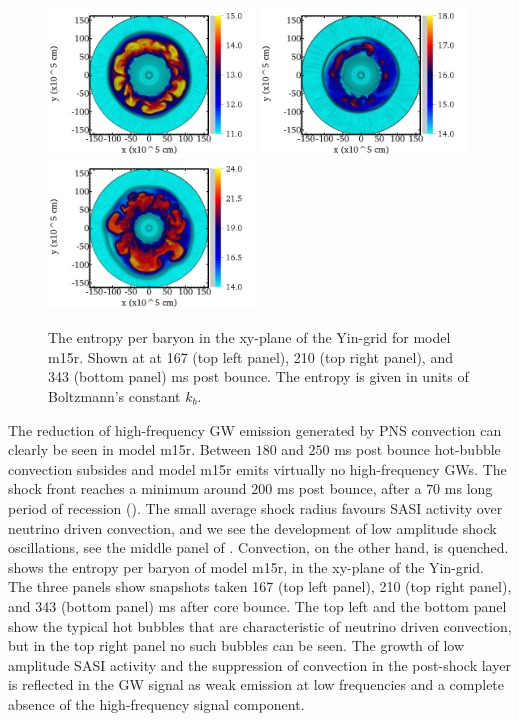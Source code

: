 \begin{figure}[ht]         
\centering                            
\includegraphics[width=0.49\textwidth]{./images/paper2/1.png}
\includegraphics[width=0.49\textwidth]{./images/paper2/2.png} \\
\includegraphics[width=0.49\textwidth]{./images/paper2/3.png}
\caption{The entropy per baryon in the xy-plane of the Yin-grid for model m15r. Shown at
at 167 (top left panel), 210 (top right panel), and 343 (bottom panel) ms post bounce. 
The entropy is given in units of Boltzmann's constant $k_b$. \label{figp2:sto}}
\end{figure}

The reduction of high-frequency GW emission generated by PNS convection can clearly be seen in model
m15r. Between $180$ and $250$ ms post bounce hot-bubble convection subsides and model m15r emits virtually no high-frequency GWs. The shock front reaches a minimum around $200$ ms post bounce, after
a $70$ ms long period of recession (). The small average shock radius favours SASI activity over
neutrino driven convection, and we see the development of low amplitude shock oscillations,
see the middle panel of . Convection, on the other hand, is quenched. 
 shows the entropy per baryon of model m15r, in the xy-plane of the Yin-grid.
The three panels show snapshots taken 167 (top left panel), 210 (top right panel), and 343 (bottom panel) ms
after core bounce. The top left and the bottom panel show the typical hot bubbles that are characteristic of
neutrino driven convection, but in the top right panel no such bubbles can be seen. 
The growth of low amplitude SASI activity and the suppression of convection in the post-shock layer is reflected
in the GW signal as weak emission at low frequencies and a complete absence of the high-frequency signal component.

